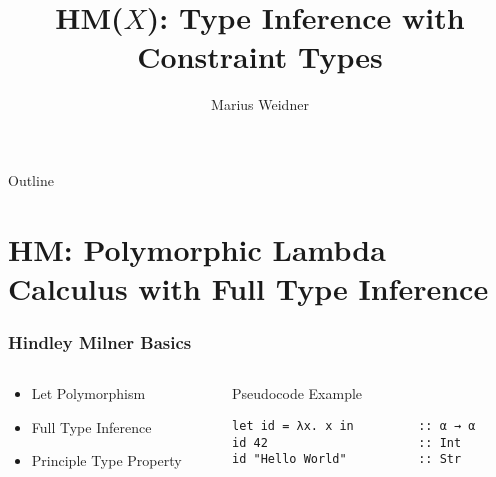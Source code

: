 \documentclass[aspectratio=169]{beamer}
\title{HM($X$): Type Inference with Constraint Types}
\institute[Uni Freiburg]{Chair of Programming Languages, University of
  Freiburg}
\author{Marius Weidner}
\begin{document}
\begin{frame}
  \titlepage
\end{frame}

\begin{frame}{Outline}
  \tableofcontents
\end{frame}

\section{HM: Polymorphic Lambda Calculus with Full Type Inference}

\begin{frame}[fragile]
  \frametitle{Hindley Milner Basics}
  \begin{columns}
    \begin{column}{0.3\textwidth}
      \begin{center}
        \begin{itemize}
          \item Let Polymorphism
          \item Full Type Inference
          \item Principle Type Property
        \end{itemize}
      \end{center}
    \end{column}
    \begin{column}{0.6\textwidth}
      \begin{center}
        \begin{block}{Pseudocode Example}
          \begin{verbatim}
let id = λx. x in         :: α → α 
id 42                     :: Int
id "Hello World"          :: Str
          \end{verbatim}
        \end{block}
      \end{center}
    \end{column}
  \end{columns}
\end{frame}
\end{document}
